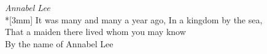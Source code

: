 \documentclass{article}
\begin{document}
\emph{Annabel Lee}\\*[3mm]
It was many and many a year ago,\linebreak
In a kingdom by the sea,\\
That a maiden there lived whom you may know\\
By the name of Annabel Lee
\end{document}
